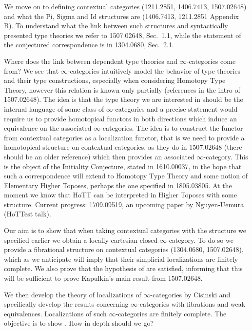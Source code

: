 \documentclass[a4paper,fontsize=12pt]{scrartcl}
\begin{document}
We move on to defining contextual categories (1211.2851, 1406.7413, 1507.02648)
and what
the Pi, Sigma and Id structures are (1406.7413, 1211.2851 Appendix B). To
understand what the link between such structures and syntactically presented
type theories we refer to 1507.02648, Sec.\ 1.1, while the statement of the
conjectured correspondence is in 1304.0680, Sec.\ 2.1.

Where does the link between dependent type theories and $\infty$-categories come
from? We see that $\infty$-categories intuitively model the behavior of type
theories and their type constructions, especially when considering Homotopy Type
Theory, however this relation is known only
partially (references in the intro of 1507.02648). The idea is that the type
theory we are interested in should be the internal language of some class of
$\infty$-categories and a precise statement would require us to provide
homotopical functors in both directions which induce an equivalence on the
associated $\infty$-categories. The idea is to construct the
functor from contextual categories as a localization functor, that is we need to
provide a homotopical structure on contextual categories, as they do in
1507.02648 (there should be an older reference) which then provides an
associated $\infty$-category. This is the object of the Initiality Conjecture,
stated in 1610.00037, in the hope that such a correspondence will extend to
Homotopy Type Theory and some notion of Elementary Higher Toposes, perhaps the
one specified in 1805.03805. At the moment we know that HoTT can be interpreted
in Higher Toposes with some structure. Current progress: 1709.09519, an upcoming
paper by Nguyen-Uemura (HoTTest talk).

Our aim is to show that when taking contextual categories with the structure we
specified earlier we obtain a locally cartesian closed $\infty$-category. To do
so we provide a fibrational structure on contextual categories (1304.0680,
1507.02648), which as we anticipate will imply that their simplicial
localizations are finitely complete. We also prove that the hypothesis of
\cite[Thm.\ 7.6.16]{Cis19} are satisfied, informing that this will be sufficient
to prove Kapulkin's main result from 1507.02648.

We then develop the theory of localizations of $\infty$-categories by Cisinski
and specifically develop the results concerning $\infty$-categories with
fibrations and weak equivalences. Localizations of such $\infty$-categories are
finitely complete. The objective is to show \cite[Thm.\ 7.6.16]{Cis19}. How in
depth should we go?
\end{document}
